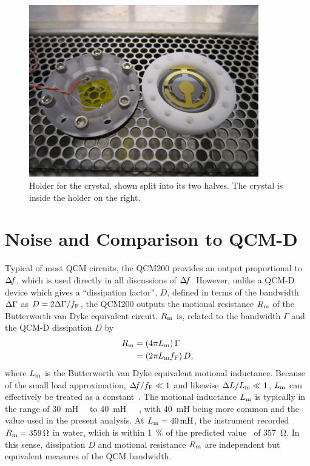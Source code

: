 \begin{figure}[ht]
\centering
\includegraphics[width=10cm,keepaspectratio]{qcm/figures/qcm_holderdiss.jpg}
\caption{Holder for the crystal, shown split into its two halves.  The
crystal is inside the holder on the right.}
\label{fig:cfqcmexpsetup}
\end{figure}

\section{Noise and Comparison to QCM-D} \label{sec:suppqcmdcomp}
Typical of most QCM circuits, the QCM200 provides an output proportional to
$\Delta\!f$, which is used directly in all discussions of $\Delta\!f$.  However, unlike
a QCM-D device which gives a ``dissipation factor'', $D$, defined in
terms of the bandwidth $\Delta\Gamma$ as $D=2\Delta\Gamma/f_\mathrm{F}$, the QCM200
outputs the motional resistance $R_\mathrm{m}$ of the Butterworth van Dyke
equivalent circuit.  $R_\mathrm{m}$ is, related to
the bandwidth $\Gamma$ and the QCM-D dissipation $D$ by 
\begin{align}
 R_\mathrm{m}&=\left(4 \pi L_\mathrm{m}\right) \Gamma\\
 &=\left(2 \pi L_\mathrm{m} f_\mathrm{F}\right) D,
\end{align}
where $L_\mathrm{m}$ is the Butterworth van Dyke equivalent motional inductance.
Because of the small load approximation, $\Delta\!f/f_\mathrm{F} \ll 1$ and
likewise $\Delta L/L_\mathrm{m} \ll 1$, $L_\mathrm{m}$ can effectively be treated as a
constant~\cite{geelhood2002transient}.  The motional inductance $L_\mathrm{m}$ is
typically in the range of
\SI{30}{\milli\henry}~\cite{srsqcm200manual}~\cite{hussain2005ots} to
\SI{40}{\milli\henry}~\cite{gottschling2000detection}~\cite{arnau2002circuit}~\cite{snellings2001response},
with \SI{40}{\milli\henry} being more common and the value used in the
present analysis.  At $\Lm=\SI{40}{\milli\henry}$, the instrument recorded
$R_\mathrm{m}=\SI{359}{\ohm}$ in water, which is within \SI{1}{\percent} of the
predicted value~\cite{kanazawa1985frequency} of \SI{357}{\ohm}.  In this
sense, dissipation $D$ and motional resistance $R_\mathrm{m}$ are independent but
equivalent measures of the QCM bandwidth.

